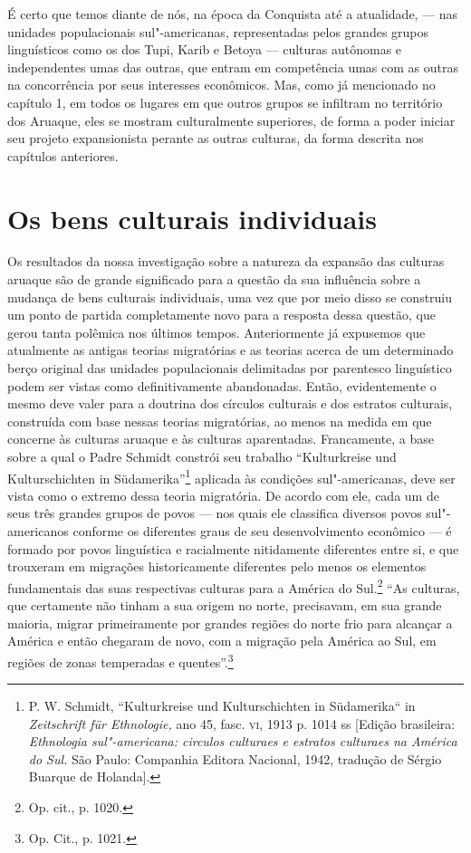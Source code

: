 É certo que temos diante de nós, na época da Conquista até a atualidade,
--- nas unidades populacionais sul"-americanas, representadas pelos
grandes grupos linguísticos como os dos Tupi, Karib e Betoya --- culturas
autônomas e independentes umas das outras, que entram em competência
umas com as outras na concorrência por seus interesses econômicos. Mas,
como já mencionado no capítulo 1, em todos os lugares em que outros
grupos se infiltram no território dos Aruaque, eles se mostram
culturalmente superiores, de forma a poder iniciar seu projeto
expansionista perante as outras culturas, da forma descrita nos
capítulos anteriores.

\chapter*{Os bens culturais individuais\smallskip{}}


Os resultados da nossa investigação sobre a natureza da expansão das
culturas aruaque são de grande significado para a questão da sua
influência sobre a mudança de bens culturais individuais, uma vez que
por meio disso se construiu um ponto de partida completamente novo para
a resposta dessa questão, que gerou tanta polêmica nos últimos tempos.
Anteriormente já expusemos que atualmente as antigas teorias migratórias
e as teorias acerca de um determinado berço original das unidades
populacionais delimitadas por parentesco linguístico podem ser vistas
como definitivamente abandonadas. Então, evidentemente o mesmo deve
valer para a doutrina dos círculos culturais e dos estratos culturais,
construída com base nessas teorias migratórias, ao menos na medida em
que concerne às culturas aruaque e às culturas aparentadas. Francamente,
a base sobre a qual o Padre Schmidt constrói seu trabalho ``Kulturkreise
und Kulturschichten in Südamerika''\footnote{P. W. Schmidt,
  ``Kulturkreise und Kulturschichten in Südamerika`` in
  \emph{Zeitschrift für Ethnologie,} ano 45, fasc. \textsc{vi}, 1913 p. 1014 ss
  {[}Edição brasileira: \emph{Ethnologia sul"-americana: circulos
  culturaes e estratos culturaes na América do Sul.} São Paulo:
  Companhia Editora Nacional, 1942, tradução de Sérgio Buarque de
  Holanda{]}.} aplicada às condições sul"-americanas, deve ser vista como
o extremo dessa teoria migratória. De acordo com ele, cada um de seus
três grandes grupos de povos --- nos quais ele classifica diversos povos
sul"-americanos conforme os diferentes graus de seu desenvolvimento
econômico --- é formado por povos linguística e racialmente nitidamente
diferentes entre si, e que trouxeram em migrações historicamente
diferentes pelo menos os elementos fundamentais das suas respectivas
culturas para a América do Sul.\footnote{Op. cit., p. 1020.} ``As
culturas, que certamente não tinham a sua origem no norte, precisavam,
em sua grande maioria, migrar primeiramente por grandes regiões do
norte frio para alcançar a América e então chegaram de novo, com a
migração pela América ao Sul, em regiões de zonas temperadas e
quentes''.\footnote{Op. Cit., p. 1021.}

